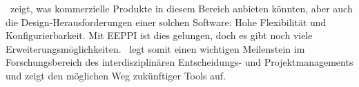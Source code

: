 	\eeppi\ zeigt, was kommerzielle Produkte in diesem Bereich anbieten könnten,
	aber auch die Design-Herausforderungen einer solchen Software: 
	Hohe Flexibilität und Konfigurierbarkeit.
	Mit EEPPI ist dies gelungen, doch es gibt noch viele Erweiterungsmöglichkeiten.
	\eeppi\ legt somit einen wichtigen Meilenstein im Forschungsbereich des interdisziplinären Entscheidungs- und Projektmanagements und
	zeigt den möglichen Weg zukünftiger Tools auf.
	
	\captionsetup[figure]{labelformat=default} %